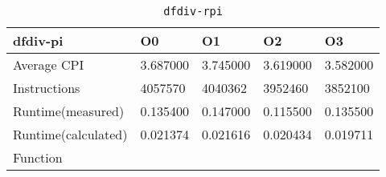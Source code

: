 \begin{table}[ht!]
\centering
\caption{\texttt{dfdiv-rpi}}
\label{tab:dfdiv-rpi}
\begin{tabular}{|l|l|l|l|l|}
\hline
\textbf{dfdiv-pi}	&	\textbf{O0}	&	\textbf{O1}	&	\textbf{O2}	&	\textbf{O3}	\\\hline\hline
Average CPI	&	3.687000	&	3.745000	&	3.619000	&	3.582000	\\\hline
Instructions	&	4057570	&	4040362	&	3952460	&	3852100	\\\hline
Runtime(measured)	&	0.135400	&	0.147000	&	0.115500	&	0.135500	\\\hline
Runtime(calculated)	&	0.021374	&	0.021616	&	0.020434	&	0.019711	\\\hline
Function	&		&		&		&		\\\hline
\end{tabular}
\end{table}
